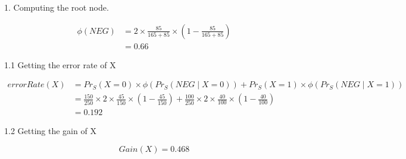 \documentclass{article}
\begin{document}
1. Computing the root node.

\begin{equation}
\begin{split}
\phi(NEG) & = 2 \times \frac{85}{165+85} \times (1 - \frac{85}{165+85}) \\
& = 0.66
\end{split}
\end{equation}

1.1 Getting the error rate of X

\begin{equation}
\begin{split}
errorRate(X) & = Pr_S(X=0) \times \phi (Pr_S(NEG \mid X=0)) + Pr_S(X=1) \times \phi (Pr_S(NEG \mid X=1)) \\
&= \frac{150}{250} \times 2 \times \frac{45}{150} \times (1 - \frac{45}{150}) + \frac{100}{250} \times 2 \times \frac{40}{100} \times (1 - \frac{40}{100}) \\
&= 0.192
\end{split}
\end{equation}

1.2 Getting the gain of X

\begin{equation}
Gain(X) = 0.468
\end{equation}
\end{document}
